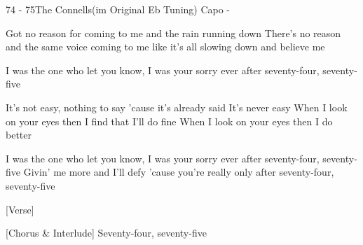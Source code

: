 \begin{song}{74 - 75}{The Connells}{(im Original Eb Tuning) Capo -}

Got no reason for coming to me and the rain running down
There's no reason
and the same voice coming to me like it's all slowing down
and believe me

I was the one who let you know, I was your sorry ever after
seventy-four, seventy-five

It's not easy, nothing to say 'cause it's already said
It's never easy
When I look on your eyes then I find that I'll do fine
When I look on your eyes then I do better

I was the one who let you know, I was your sorry ever after
seventy-four, seventy-five
Givin' me more and I'll defy 'cause you're really only after
seventy-four, seventy-five


[Verse]

[Chorus & Interlude]
        Seventy-four, seventy-five
\end{song}
